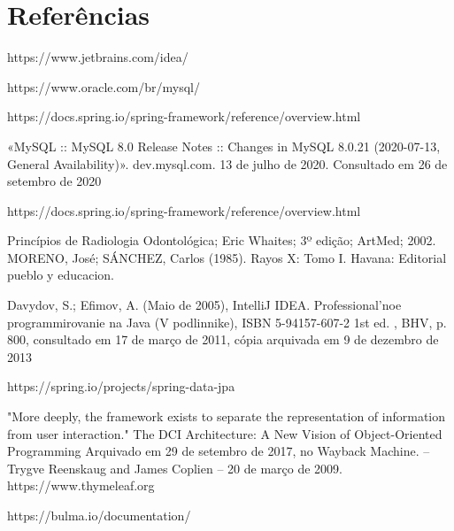 \documentclass[conference]{IEEEtran}
\begin{document}
\section{Referências}
https://www.jetbrains.com/idea/

https://www.oracle.com/br/mysql/

https://docs.spring.io/spring-framework/reference/overview.html

«MySQL :: MySQL 8.0 Release Notes :: Changes in MySQL 8.0.21 (2020-07-13, General Availability)». dev.mysql.com. 13 de julho de 2020. Consultado em 26 de setembro de 2020

https://docs.spring.io/spring-framework/reference/overview.html

Princípios de Radiologia Odontológica; Eric Whaites; 3º edição; ArtMed; 2002.
MORENO, José; SÁNCHEZ, Carlos (1985). Rayos X: Tomo I. Havana: Editorial pueblo y educacion.

Davydov, S.; Efimov, A. (Maio de 2005), IntelliJ IDEA. Professional'noe programmirovanie na Java (V podlinnike), ISBN 5-94157-607-2 1st ed. , BHV, p. 800, consultado em 17 de março de 2011, cópia arquivada em 9 de dezembro de 2013

https://spring.io/projects/spring-data-jpa

 "More deeply, the framework exists to separate the representation of information from user interaction." The DCI Architecture: A New Vision of Object-Oriented Programming Arquivado em 29 de setembro de 2017, no Wayback Machine. – Trygve Reenskaug and James Coplien – 20 de março de 2009.
https://www.thymeleaf.org

https://bulma.io/documentation/
\end{document}

